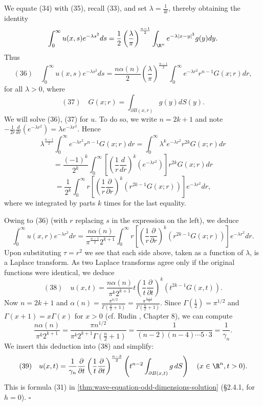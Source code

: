 \begin{example}
We equate (34) with (35), recall (33), and set $\lambda = \frac{1}{4t}$, thereby obtaining the identity
$$\int_0^\infty u(x,s)e^{-\lambda s^2} ds = \frac{1}{2}\left(\frac{\lambda}{\pi}\right)^{\frac{n-1}{2}} \int_{\R^n} e^{-\lambda|x-y|^2} g(y) dy.$$
Thus
$$(36) \quad \int_0^\infty u(x,s)e^{-\lambda s^2} ds = \frac{n\alpha(n)}{2} \left(\frac{\lambda}{\pi}\right)^{\frac{n-1}{2}} \int_0^\infty e^{-\lambda r^2} r^{n-1} G(x;r) dr,$$
for all $\lambda > 0$, where
$$(37) \quad G(x;r) = \int_{\partial B(x,r)} g(y) dS(y).$$
We will solve (36), (37) for $u$. To do so, we write $n = 2k+1$ and note $-\frac{1}{2r}\frac{d}{dr}(e^{-\lambda r^2}) = \lambda e^{-\lambda r^2}$. Hence
$$\lambda^{\frac{n-1}{2}} \int_0^\infty e^{-\lambda r^2} r^{n-1} G(x;r) dr = \int_0^\infty \lambda^k e^{-\lambda r^2} r^{2k} G(x;r) dr$$
$$= \frac{(-1)^k}{2^k} \int_0^\infty \left[\left(\frac{1}{r}\frac{d}{dr}\right)^k (e^{-\lambda r^2})\right] r^{2k} G(x;r) dr$$
$$= \frac{1}{2^k} \int_0^\infty r \left[\left(\frac{1}{r}\frac{\partial}{\partial r}\right)^k (r^{2k-1} G(x;r))\right] e^{-\lambda r^2} dr,$$
where we integrated by parts $k$ times for the last equality.

Owing to (36) (with $r$ replacing $s$ in the expression on the left), we deduce
$$\int_0^\infty u(x,r)e^{-\lambda r^2} dr = \frac{n\alpha(n)}{\pi^{\frac{n-1}{2}} 2^{k+1}} \int_0^\infty r \left[\left(\frac{1}{r}\frac{\partial}{\partial r}\right)^k (r^{2k-1} G(x;r))\right] e^{-\lambda r^2} dr.$$
Upon substituting $\tau = r^2$ we see that each side above, taken as a function of $\lambda$, is a Laplace transform. As two Laplace transforms agree only if the original functions were identical, we deduce
$$(38) \quad u(x,t) = \frac{n\alpha(n)}{\pi^k 2^{k+1}} t \left(\frac{1}{t}\frac{\partial}{\partial t}\right)^k (t^{2k-1} G(x,t)).$$
Now $n = 2k+1$ and $\alpha(n) = \frac{\pi^{n/2}}{\Gamma(\frac{n}{2}+1)} = \frac{\pi^{\frac{n+1}{2}}}{\Gamma(\frac{n}{2}+1)}$. Since $\Gamma\left(\frac{1}{2}\right) = \pi^{1/2}$ and $\Gamma(x+1) = x\Gamma(x)$ for $x > 0$ (cf. Rudin \cite{Rudin1976}, Chapter 8), we can compute
$$\frac{n\alpha(n)}{\pi^k 2^{k+1}} = \frac{\pi n^{1/2}}{\pi^k 2^{k+1} \Gamma\left(\frac{n}{2}+1\right)} = \frac{1}{(n-2)(n-4) \cdots 5 \cdot 3} = \frac{1}{\gamma_n}.$$
We insert this deduction into (38) and simplify:
$$(39) \quad u(x,t) = \frac{1}{\gamma_n} \frac{\partial}{\partial t}\left(\frac{1}{t}\frac{\partial}{\partial t}\right)^{\frac{n-3}{2}}\left(t^{n-2}\int_{\partial B(x,t)} g \, dS\right) \quad (x \in \R^n, t > 0).$$
This is formula (31) in \cref{thm:wave-equation-odd-dimensions-solution} (\S2.4.1, for $h = 0$). $\square$
\end{example}

